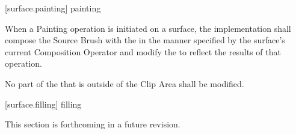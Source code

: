 %
%
%
%
%
%
%
 [surface.painting] { painting}

\pnum
When a Painting operation is initiated on a surface, the implementation shall compose the Source Brush with the \underlyingsurface in the manner specified by the surface's current Composition Operator and modify the \underlyingsurface to reflect the results of that operation.

\pnum
No part of the \underlyingsurface that is outside of the Clip Area shall be modified.

 [surface.filling] { filling}

\pnum
This section is forthcoming in a future revision.


